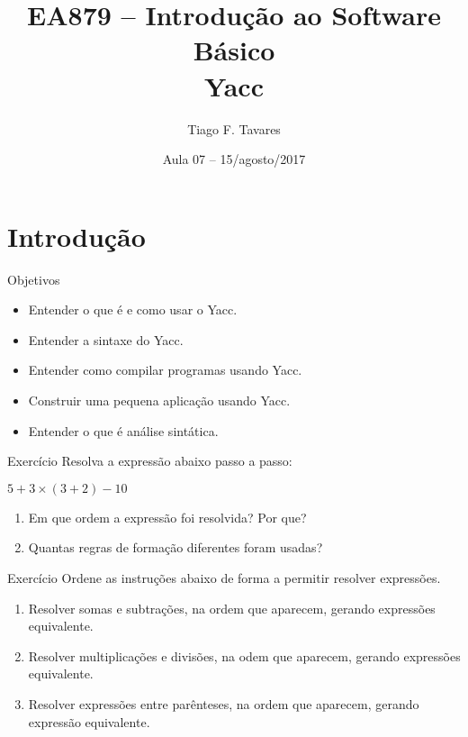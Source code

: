 \documentclass{beamer}
\title[07-Yacc]{EA879 -- Introdução ao Software Básico\\Yacc}
\author{Tiago F. Tavares}
\institute{FEEC -- UNICAMP}
\date{Aula 07 -- 15/agosto/2017}
\begin{document}
\begin{frame}
  \titlepage
\end{frame}


\section{Introdução}

\begin{frame}{Objetivos}
  \Large
  \begin{itemize}
    \item Entender o que é e como usar o Yacc.
    \item Entender a sintaxe do Yacc.
    \item Entender como compilar programas usando Yacc.
    \item Construir uma pequena aplicação usando Yacc.
    \item Entender o que é análise sintática.
  \end{itemize}
\end{frame}

\begin{frame}[fragile]{Exercício}
  \centering
  Resolva a expressão abaixo passo a passo:

  $5 + 3 \times (3 + 2) - 10$

  \begin{enumerate}
  \item Em que ordem a expressão foi resolvida? Por que?
  \item Quantas regras de formação diferentes foram usadas?
  \end{enumerate}

\end{frame}

\begin{frame}{Exercício}
  Ordene as instruções abaixo de forma a permitir resolver expressões.
  \begin{enumerate}
    \item Resolver somas e subtrações, na ordem que aparecem, gerando expressões equivalente.
    \item Resolver multiplicações e divisões, na odem que aparecem, gerando expressões equivalente.
    \item Resolver expressões entre parênteses, na ordem que aparecem, gerando
      expressão equivalente.
  \end{enumerate}

\end{frame}
\end{document}
